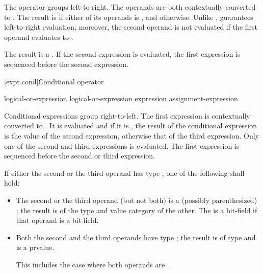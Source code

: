 \pnum
The \tcode{||} operator groups left-to-right. The operands are both
contextually converted to .
The result is
 if either of its operands is , and
 otherwise. Unlike \tcode{|}, \tcode{||} guarantees
left-to-right evaluation; moreover, the second operand is not evaluated
if the first operand evaluates to .

\pnum
The result is a .
%
If the second expression is evaluated,
the first expression is sequenced before
the second expression.

[expr.cond]{Conditional operator}%
%
%
%

\begin{bnf}
\br
    logical-or-expression\br
    logical-or-expression  expression \terminal{:} assignment-expression
\end{bnf}

\pnum
Conditional expressions group right-to-left. The first expression is
contextually converted to .
It is
evaluated and if it is , the result of the conditional
expression is the value of the second expression, otherwise that of the
third expression. Only one of the second and third expressions is
evaluated.
The first expression is sequenced before
the second or third expression.

\pnum
If either the second or the third operand has type ,
one of the following shall hold:
\begin{itemize}
\item
{}%
The second or the third operand (but not both) is a (possibly
parenthesized) ; the result
is of the type and value category of the other.
The 
is a bit-field if that operand is a bit-field.

\item Both the second and the third operands have type ; the
result is of type  and is a prvalue.
\begin{note}
This
includes the case where both operands are .
\end{note}
\end{itemize}

